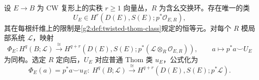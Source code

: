 \begin{theorem}[Thom 同构]\label{g2:thm:thom-isomorphism}
	设 \(E\to B\) 为 CW 复形上的实秩 \(r\ge1\) 向量丛，\(R\) 为含幺交换环。存在唯一的类
	\[
		U_E\in H^r(D(E),S(E);p^*\mathcal O_{E,R}),
	\]
	其在每根纤维上的限制是\cref{g2:def:twisted-thom-class}规定的恒等元。对每个 \(R\) 模局部系统 \(\mathcal L\)，映射
	\begin{equation}\label{g2:eq:twisted-thom-isomorphism}
		\Phi_E:H^q(B;\mathcal L)\xrightarrow{\ \cong\ }
		H^{q+r}(D(E),S(E);p^*(\mathcal L\otimes_R\mathcal O_{E,R})),
		\qquad a\longmapsto p^*a\smile U_E
	\end{equation}
	为同构。选定 \(R\) 定向后，\(U_E\) 对应普通 Thom 类 \(u_E\)，公式化为
	\[
		\Phi_E(a)=p^*a\smile u_E:\ H^q(B;\mathcal L)\xrightarrow{\ \cong\ }H^{q+r}(D(E),S(E);p^*\mathcal L).
	\]
\end{theorem}
